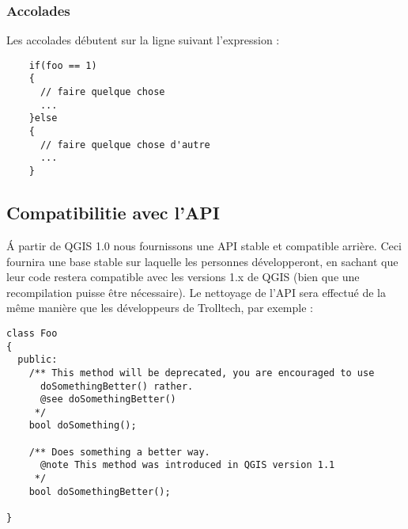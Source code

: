 \subsubsection{Accolades}
Les accolades d\'ebutent sur la ligne suivant l'expression :

\begin{verbatim}
	if(foo == 1)
	{
	  // faire quelque chose
	  ...
 	}else
	{
	  // faire quelque chose d'autre
	  ...
	}
\end{verbatim}

\subsection{Compatibilitie avec l'API}
\'A partir de QGIS 1.0 nous fournissons une API stable et compatible arri\`ere. Ceci fournira une base stable sur laquelle les personnes d\'evelopperont, en sachant que leur code restera compatible avec les versions 1.x de QGIS (bien que une recompilation puisse \^etre n\'ecessaire). Le nettoyage de l'API sera effectu\'e de la m\^eme mani\`ere que les d\'eveloppeurs de Trolltech, par exemple :

\begin{verbatim}
class Foo 
{
  public:
    /** This method will be deprecated, you are encouraged to use 
      doSomethingBetter() rather.
      @see doSomethingBetter()
     */
    bool doSomething();

    /** Does something a better way.
      @note This method was introduced in QGIS version 1.1
     */
    bool doSomethingBetter();

}
\end{verbatim}

